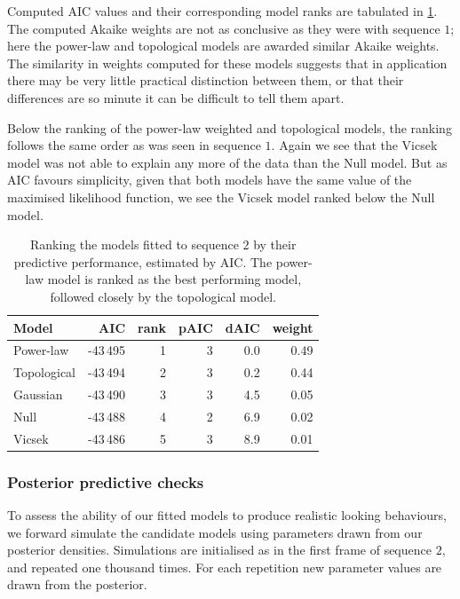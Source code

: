Computed AIC values and their corresponding model ranks are tabulated in
\cref{tab:aic_seq2}. The computed Akaike weights are not as conclusive as they
were with sequence $1$; here the power-law and topological models are awarded
similar Akaike weights. The similarity in weights computed for these models
suggests that in application there may be very little practical distinction
between them, or that their differences are so minute it can be difficult to
tell them apart.

Below the ranking of the power-law weighted and topological models, the ranking
follows the same order as was seen in sequence $1$. Again we see that the
Vicsek model was not able to explain any more of the data than the Null model.
But as AIC favours simplicity, given that both models have the same value of
the maximised likelihood function, we see the Vicsek model ranked below the
Null model.

\begin{table}[tbp]
\begin{tabular}{@{}lrrrrr@{}}
\toprule
Model                       &        AIC & rank & pAIC & dAIC & weight \\
\midrule
Power-law                   & -43\,495 &    1 &  3 &  0.0 &   0.49 \\
Topological                 & -43\,494 &    2 &  3 &  0.2 &   0.44 \\
Gaussian                    & -43\,490 &    3 &  3 &  4.5 &   0.05 \\
Null                        & -43\,488 &    4 &  2 &  6.9 &   0.02 \\
Vicsek                      & -43\,486 &    5 &  3 &  8.9 &   0.01 \\
\bottomrule
\end{tabular}
\caption{Ranking the models fitted to sequence $2$ by their predictive
  performance, estimated by AIC. The power-law model is ranked as the best
  performing model, followed closely by the topological model.}
\label{tab:aic_seq2}
\end{table}

\subsubsection{Posterior predictive checks}

To assess the ability of our fitted models to produce realistic looking
behaviours, we forward simulate the candidate models using parameters drawn
from our posterior densities. Simulations are initialised as in the first frame
of sequence $2$, and repeated one thousand times. For each repetition new
parameter values are drawn from the posterior.

